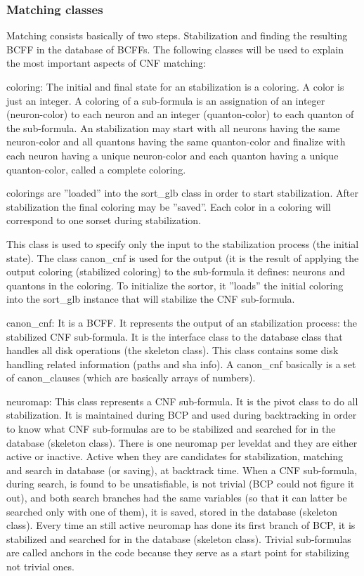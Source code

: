 \documentclass{easychair}
\newcommand{\neuron}{\textsf{neuron}}
\newcommand{\quanton}{\textsf{quanton}}
\newcommand{\leveldat}{\textsf{leveldat}}
\newcommand{\sortglb}{\textsf{sort\_glb}}
\newcommand{\sorset}{\textsf{sorset}}
\newcommand{\coloring}{\textsf{coloring}}
\newcommand{\canoncnf}{\textsf{canon\_cnf}}
\newcommand{\canonclause}{\textsf{canon\_clause}}
\newcommand{\neuromap}{\textsf{neuromap}}
\newcommand{\skeleton}{\textsf{skeleton}}
\begin{document}
\subsubsection{Matching classes}

Matching consists basically of two steps. Stabilization and finding the resulting BCFF in the database of BCFFs. The following classes will be used to explain the most important aspects of CNF matching:

{\coloring}: The initial and final state for an stabilization is a {\coloring}. A color is just an integer. A {\coloring} of a sub-formula is an assignation of an integer ({\neuron}-color) to each {\neuron} and an integer ({\quanton}-color) to each {\quanton} of the sub-formula. An stabilization may start with all {\neuron}s having the same {\neuron}-color and all {\quanton}s having the same {\quanton}-color and finalize with each {\neuron} having a unique {\neuron}-color and each {\quanton} having a unique {\quanton}-color, called a complete {\coloring}. 

{\coloring}s are ''loaded'' into the {\sortglb} class in order to start stabilization. After stabilization the final {\coloring} may be ''saved''. Each color in a coloring will correspond to one {\sorset} during stabilization.

This class is used to specify only the input to the stabilization process (the initial state). The class {\canoncnf} is used for the output (it is the result of applying the output {\coloring} (stabilized {\coloring}) to the sub-formula it defines: {\neuron}s and {\quanton}s in the {\coloring}. To initialize the sortor, it ''loads'' the initial {\coloring} into the {\sortglb} instance that will stabilize the CNF sub-formula.

{\canoncnf}: It is a BCFF. It represents the output of an stabilization process: the stabilized CNF sub-formula. It is the interface class to the database class that handles all disk operations (the {\skeleton} class). This class contains some disk handling related information (paths and sha info). A {\canoncnf} basically is a set of {\canonclause}s (which are basically arrays of numbers).

{\neuromap}: This class represents a CNF sub-formula. It is the pivot class to do all stabilization. It is maintained during BCP and used during backtracking in order to know what CNF sub-formulas are to be stabilized and searched for in the database ({\skeleton} class). There is one {\neuromap} per {\leveldat} and they are either active or inactive. Active when they are candidates for stabilization, matching and search in database (or saving), at backtrack time. When a CNF  sub-formula, during search, is found to be unsatisfiable, is not trivial (BCP could not figure it out), and both search branches had the same variables (so that it can latter be searched only with one of them), it is saved, stored in the database ({\skeleton} class). Every time an still active {\neuromap} has done its first branch of BCP, it is stabilized and searched for in the database ({\skeleton} class). Trivial sub-formulas are called anchors in the code because they serve as a start point for stabilizing not trivial ones. 
\end{document}

